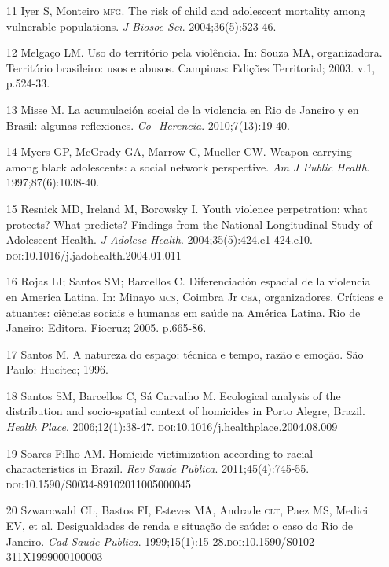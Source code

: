 \documentclass{article}
\begin{document}
\begin{itemize}
\item[11] Iyer S, Monteiro \textsc{mfg}. The risk of child and adolescent mortality among
vulnerable populations. \textit{J Biosoc Sci}. 2004;36(5):523-46.

\item[12] Melgaço LM. Uso do território pela violência. In: Souza MA,
organizadora. Território brasileiro: usos e abusos. Campinas: Edições
Territorial; 2003. v.1, p.524-33.

\item[13] Misse M. La acumulación social de la violencia en Rio de Janeiro y en
Brasil: algunas reflexiones. \textit{Co- Herencia}. 2010;7(13):19-40.

\item[14] Myers GP, McGrady GA, Marrow C, Mueller CW. Weapon carrying among
black adolescents: a social network perspective. \textit{Am J Public Health}. 1997;87(6):1038-40.

\item[15] Resnick MD, Ireland M, Borowsky I. Youth violence perpetration: what
protects? What predicts? Findings from the National Longitudinal Study of
Adolescent Health. \textit{J Adolesc Health}. 2004;35(5):424.e1-424.e10. \textsc{doi}:10.1016/j.jadohealth.2004.01.011

\item[16] Rojas LI; Santos SM; Barcellos C. Diferenciación espacial de la
violencia en America Latina. In: Minayo \textsc{mcs}, Coimbra Jr \textsc{cea}, organizadores.
Críticas e atuantes: ciências sociais e humanas em saúde na América Latina. Rio
de Janeiro: Editora. Fiocruz; 2005. p.665-86.

\item[17] Santos M. A natureza do espaço: técnica e tempo, razão e emoção. São
Paulo: Hucitec; 1996.

\item[18] Santos SM, Barcellos C, Sá Carvalho M. Ecological analysis of the
distribution and socio-spatial context of homicides in Porto Alegre, Brazil.
\textit{Health Place}. 2006;12(1):38-47. \textsc{doi}:10.1016/j.healthplace.2004.08.009

\item[19] Soares Filho AM. Homicide victimization according to racial
characteristics in Brazil. \textit{Rev Saude Publica}. 2011;45(4):745-55. \textsc{doi}:10.1590/S0034-89102011005000045

\item[20] Szwarcwald CL, Bastos FI, Esteves MA, Andrade \textsc{clt}, Paez MS, Medici EV,
et al. Desigualdades de renda e situação de saúde: o caso do Rio de Janeiro.
\textit{Cad Saude Publica}. 1999;15(1):15-28.\textsc{doi}:10.1590/S0102-311X1999000100003


\end{itemize}
\end{document}
